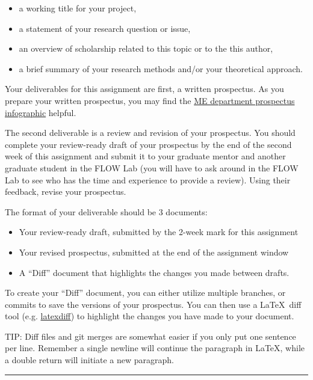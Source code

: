 \documentclass[12pt]{article}
\begin{document}
\begin{itemize}
	\item a working title for your project,
	\item a statement of your research question or issue,
	\item an overview of scholarship related to this topic or to the this author,
	\item a brief summary of your research methods and/or your theoretical approach.
\end{itemize}

Your deliverables for this assignment are first, a written prospectus.
As you prepare your written prospectus, you may find the \href{https://www.me.byu.edu/00000177-4afb-d009-abf7-ebff31d50000/prospectus-outline-pdf-pdf}{ME department prospectus infographic} helpful.

The second deliverable is a review and revision of your prospectus.
You should complete your review-ready draft of your prospectus by the end of the second week of this assignment and submit it to your graduate mentor and another graduate student in the FLOW Lab (you will have to ask around in the FLOW Lab to see who has the time and experience to provide a review).
Using their feedback, revise your prospectus.

The format of your deliverable should be 3 documents:
\begin{itemize}
	\item Your review-ready draft, submitted by the 2-week mark for this assignment
	\item Your revised prospectus, submitted at the end of the assignment window
	\item A ``Diff'' document that highlights the changes you made between drafts.
\end{itemize}

To create your ``Diff'' document, you can either utilize multiple branches, or commits to save the versions of your prospectus.
You can then use a \LaTeX~diff tool (e.g. \href{https://texblog.org/2018/08/14/track-changes-with-latexdiff/}{latexdiff}) to highlight the changes you have made to your document.

\bigskip

TIP: Diff files and git merges are somewhat easier if you only put one sentence per line.
Remember a single newline will continue the paragraph in \LaTeX, while a double return will initiate a new paragraph.



\vspace{1em}\hrule\vspace{1em}
\end{document}
